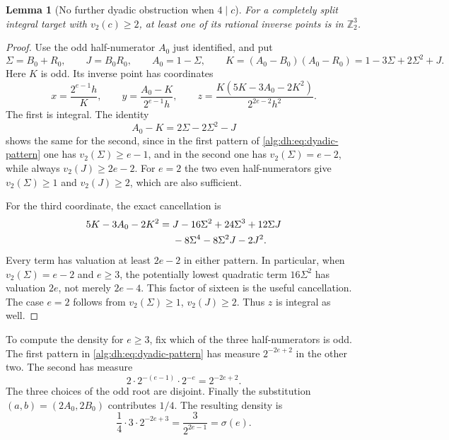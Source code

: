 \documentclass[11pt]{article}
\numberwithin{equation}{section}
\theoremstyle{plain}
\theoremstyle{plain}
\newtheorem{lemma}[lemma]{Lemma}
\theoremstyle{plain}
\theoremstyle{definition}
\theoremstyle{definition}
\theoremstyle{definition}
\theoremstyle{remark}
\newcommand{\Z}{\mathbb Z}\newcommand{\Q}{\mathbb Q}
\begin{document}
\begin{lemma}[No further dyadic obstruction when $4\mid c$]\label{alg:dh:lem:dyadic-lift}
For a completely split integral target with $v_2(c)\ge2$, at least one
of its rational inverse points is in $\Z_2^3$.
\end{lemma}
\begin{proof}
Use the odd half-numerator $A_0$ just identified, and put
\[
 \Sigma=B_0+R_0,\qquad J=B_0R_0,\qquad
 A_0=1-\Sigma,\qquad K=(A_0-B_0)(A_0-R_0)=1-3\Sigma+2\Sigma^2+J.
\]
Here $K$ is odd. Its inverse point has coordinates
\begin{equation}\label{alg:dh:eq:dyadic-source}
 x=\frac{2^{e-1}h}{K},\qquad
 y=\frac{A_0-K}{2^{e-1}h},\qquad
 z=\frac{K(5K-3A_0-2K^2)}{2^{2e-2}h^2}.
\end{equation}
The first is integral. The identity
\[
 A_0-K=2\Sigma-2\Sigma^2-J
\]
shows the same for the second, since in the first pattern of
\eqref{alg:dh:eq:dyadic-pattern} one has $v_2(\Sigma)\ge e-1$, and in the second
one has $v_2(\Sigma)=e-2$, while always $v_2(J)\ge2e-2$.
For $e=2$ the two even half-numerators give $v_2(\Sigma)\ge1$ and
$v_2(J)\ge2$, which are also sufficient.

For the third coordinate, the exact cancellation is
\begin{align}\label{alg:dh:eq:dyadic-cancellation}
 5K-3A_0-2K^2
 ={}&J-16\Sigma^2+24\Sigma^3+12\Sigma J\\
 &{}-8\Sigma^4-8\Sigma^2J-2J^2.\notag
\end{align}
Every term has valuation at least $2e-2$ in either pattern. In particular,
when $v_2(\Sigma)=e-2$ and $e\ge3$, the potentially lowest quadratic term
$16\Sigma^2$ has valuation $2e$, not merely $2e-4$.
This factor of sixteen is the useful cancellation. The case $e=2$
follows from $v_2(\Sigma)\ge1$, $v_2(J)\ge2$. Thus $z$ is integral as well.
\end{proof}

To compute the density for $e\ge3$, fix which of the three half-numerators
is odd. The first pattern in \eqref{alg:dh:eq:dyadic-pattern} has measure
$2^{-2e+2}$ in the other two. The second has measure
\[
 2\cdot2^{-(e-1)}\cdot2^{-e}=2^{-2e+2}.
\]
The three choices of the odd root are disjoint. Finally the substitution
$(a,b)=(2A_0,2B_0)$ contributes $1/4$. The resulting density is
\[
 \frac14\cdot3\cdot2^{-2e+3}=\frac3{2^{2e-1}}=\sigma(e).
\]
\end{document}
